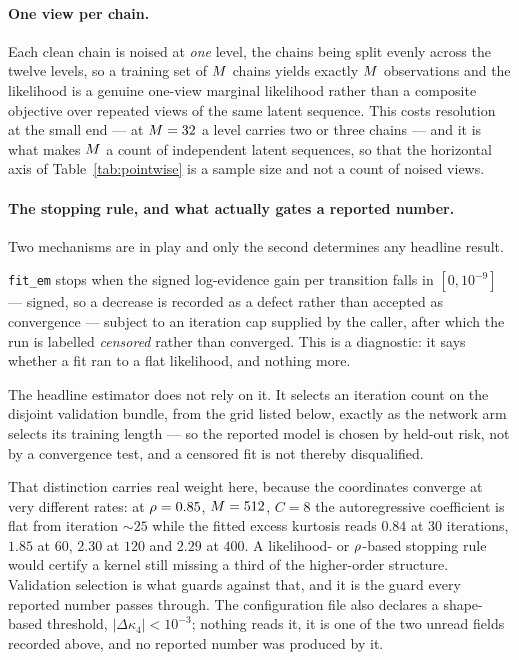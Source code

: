 \paragraph{One view per chain.} Each clean chain is noised at \emph{one} level, the chains being
split evenly across the twelve levels, so a training set of $M$ chains yields exactly $M$
observations and the likelihood is a genuine one-view marginal likelihood rather than a composite
objective over repeated views of the same latent sequence. This costs resolution at the small end
--- at $M=32$ a level carries two or three chains --- and it is what makes $M$ a count of
independent latent sequences, so that the horizontal axis of Table~\ref{tab:pointwise} is a
sample size and not a count of noised views.

\paragraph{The stopping rule, and what actually gates a reported number.} Two mechanisms are in
play and only the second determines any headline result.

\texttt{fit\_em} stops when the signed log-evidence gain per transition falls in $[0,10^{-9}]$ ---
signed, so a decrease is recorded as a defect rather than accepted as convergence --- subject to an
iteration cap supplied by the caller, after which the run is labelled \emph{censored} rather than
converged. This is a diagnostic: it says whether a fit ran to a flat likelihood, and nothing more.

The headline estimator does not rely on it. It selects an iteration count on the disjoint
validation bundle, from the grid listed below, exactly as the network arm selects its training
length --- so the reported model is chosen by held-out risk, not by a convergence test, and a
censored fit is not thereby disqualified.

That distinction carries real weight here, because the coordinates converge at very different
rates: at $\rho=0.85$, $M=512$, $C=8$ the autoregressive coefficient is flat from iteration
${\sim}25$ while the fitted excess kurtosis reads $0.84$ at $30$ iterations, $1.85$ at $60$,
$2.30$ at $120$ and $2.29$ at $400$. A likelihood- or $\rho$-based stopping rule would certify a
kernel still missing a third of the higher-order structure. Validation selection is what guards
against that, and it is the guard every reported number passes through. The configuration file
also declares a shape-based threshold, $|\Delta\kappa_4|<10^{-3}$; nothing reads it, it is one of
the two unread fields recorded above, and no reported number was produced by it.

